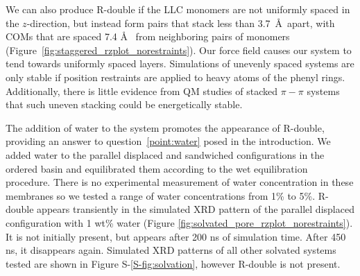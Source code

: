 \documentclass[journal=jpcbfk,manuscript=article]{achemso}
\begin{document}
  We can also produce R-double if the LLC monomers are not uniformly spaced in the
  $z$-direction, but instead form pairs that stack less than 3.7~\AA~apart, with
  COMs that are spaced 7.4 \AA~ from neighboring pairs of monomers 
  (Figure~\ref{fig:staggered_rzplot_norestraints}). 
  Our force field causes our system to tend towards uniformly spaced layers.
  Simulations of unevenly spaced systems are only stable if position restraints
  are applied to heavy atoms of the phenyl rings.  Additionally, there is little
  evidence from QM studies of stacked $\pi-\pi$ systems that such uneven stacking
  could be energetically stable.~\cite{tauer_beyond_2005} 
  
  The addition of water to the system promotes the appearance of R-double, providing
  an answer to question~\ref{point:water} posed in the introduction.
  We added water to the parallel displaced and sandwiched configurations in the
  ordered basin and equilibrated them according to the wet equilibration
  procedure. There is no experimental measurement of water concentration in these
  membranes so we tested a range of water concentrations from 1\% to 5\%.
  R-double appears transiently in the simulated XRD pattern of the parallel
  displaced configuration with 1 wt\% water (Figure
  \ref{fig:solvated_pore_rzplot_norestraints}). It is not initially present, but
  appears after 200 ns of simulation time. After 450 ns, it disappears again.
  Simulated XRD patterns of all other solvated systems tested are shown in Figure
  S-\ref{S-fig:solvation}, however R-double is not present.
\end{document}
